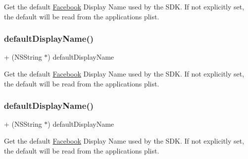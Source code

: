 Get the default \hyperlink{interfaceFacebook}{Facebook} Display Name used by the S\+DK. If not explicitly set, the default will be read from the application\textquotesingle{}s plist. \mbox{\label{interfaceFBSettings_a64b1fe4c26086a1a2bb5b162815f2786}} 
\subsubsection{\texorpdfstring{default\+Display\+Name()}{defaultDisplayName()}\hspace{0.1cm}{\footnotesize\ttfamily [2/5]}}
{\footnotesize\ttfamily + (N\+S\+String $\ast$) default\+Display\+Name \begin{DoxyParamCaption}{ }\end{DoxyParamCaption}}

Get the default \hyperlink{interfaceFacebook}{Facebook} Display Name used by the S\+DK. If not explicitly set, the default will be read from the application\textquotesingle{}s plist. \mbox{\label{interfaceFBSettings_a64b1fe4c26086a1a2bb5b162815f2786}} 
\subsubsection{\texorpdfstring{default\+Display\+Name()}{defaultDisplayName()}\hspace{0.1cm}{\footnotesize\ttfamily [3/5]}}
{\footnotesize\ttfamily + (N\+S\+String $\ast$) default\+Display\+Name \begin{DoxyParamCaption}{ }\end{DoxyParamCaption}}

Get the default \hyperlink{interfaceFacebook}{Facebook} Display Name used by the S\+DK. If not explicitly set, the default will be read from the application\textquotesingle{}s plist. \mbox{\label{interfaceFBSettings_a64b1fe4c26086a1a2bb5b162815f2786}} 

